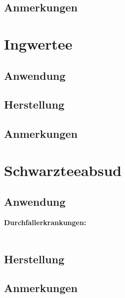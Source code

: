 \subsection{Anmerkungen}



\section{Ingwertee}

\subsection{Anwendung}

\subsection{Herstellung}

\subsection{Anmerkungen}




\section{Schwarzteeabsud}

\subsection{Anwendung}

\textbf{Durchfallerkrankungen:} \\ \\


\subsection{Herstellung}

\subsection{Anmerkungen}

